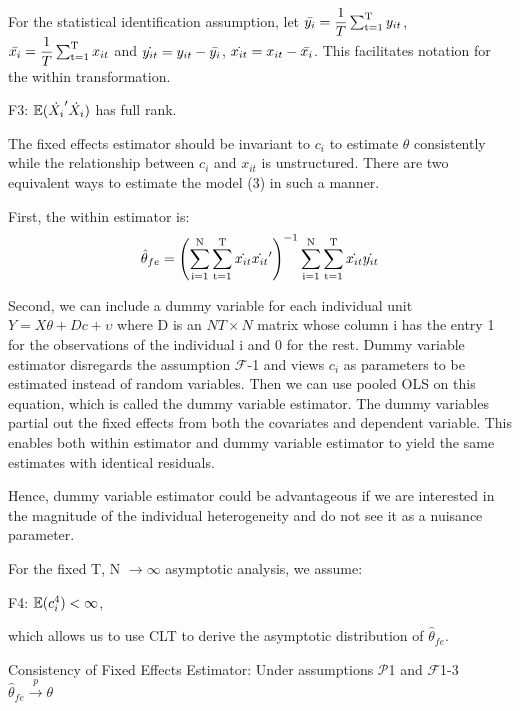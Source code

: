 For the statistical identification assumption, let $\Bar{y_i} = \dfrac{1}{T}\operatorname*{\sum_{t=1}^T} y_{it}$, $\Bar{x_i} = \dfrac{1}{T}\operatorname*{\sum_{t=1}^T} x_{it}$ and $\dot{y_{it}} = y_{it} -\Bar{y_i}$, $\dot{x_{it}} = x_{it} - \Bar{x_i}$. This facilitates notation for the within transformation. %
\begin{assumption}F3: $\operatorname{\mathbb{E}}(\dot{X_{i}}'\dot{X_{i}})$ has full rank.
\end{assumption}
The fixed effects estimator should be invariant to $c_i$  to estimate $\theta$ consistently while the relationship between $c_i$ and $x_{it}$ is unstructured. There are two equivalent ways to estimate the model (3) in such a manner.

First, the within estimator is:
\begin{align}
\hat\theta_{fe} = \left(\operatorname*{\sum_{i=1}^N}\operatorname*{\sum_{t=1}^T} \dot{x_{it}}\dot{x_{it}}'\right)^{-1}\operatorname*{\sum_{i=1}^N}\operatorname*{\sum_{t=1}^T} \dot{x_{it}}\dot{y_{it}}
\end{align}

Second, we can include a dummy variable for each individual unit $Y = X\theta + Dc + \upsilon$ where D is an $NT \times N $ matrix whose column i has the entry 1 for the observations of the individual i and 0 for the rest. Dummy variable estimator disregards the assumption $\mathcal{F}$-1 and views $c_i$ as parameters to be estimated instead of random variables. Then we can use pooled OLS on this equation, which is called the dummy variable estimator. The dummy variables partial out the fixed effects from both the covariates and dependent variable. This enables both within estimator and dummy variable estimator to yield the same estimates with identical residuals. 

Hence, dummy variable estimator could be advantageous if we are interested in the magnitude of the individual heterogeneity and do not see it as a nuisance parameter. 

For the fixed T, N $\rightarrow \infty$ asymptotic analysis, we assume:

\begin{assumption}F4: 
$\operatorname{\mathbb{E}}(c_i^4 ) < \infty $,
\end{assumption}
which allows us to use CLT to derive the asymptotic distribution of $\hat\theta_{fe}$.

\begin{theorem}
Consistency of Fixed Effects Estimator: Under assumptions $\mathcal{P}$1 and $\mathcal{F}$1-3 \\ $\hat{\theta}_{fe} \overset{p}{\to} \theta$
\end{theorem}

